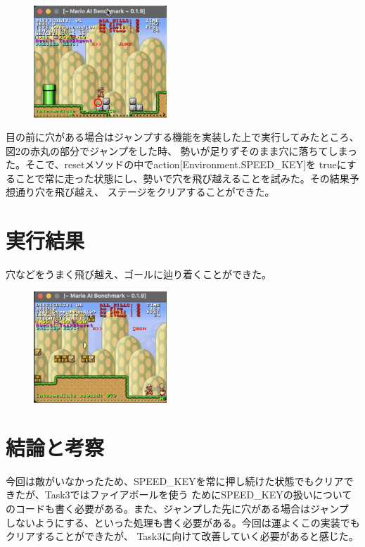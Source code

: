\documentclass[a4paper,11pt]{jsarticle}
\begin{document}
\begin{figure}
  \begin{center}
    \includegraphics*[width=50mm]{images/report2/walking-jump.png}
    \caption[図2]{}
  \end{center}
\end{figure}

目の前に穴がある場合はジャンプする機能を実装した上で実行してみたところ、図2の赤丸の部分でジャンプをした時、
勢いが足りずそのまま穴に落ちてしまった。そこで、resetメソッドの中でaction[Environment.SPEED\_KEY]を
trueにすることで常に走った状態にし、勢いで穴を飛び越えることを試みた。その結果予想通り穴を飛び越え、
ステージをクリアすることができた。

\section*{実行結果}
穴などをうまく飛び越え、ゴールに辿り着くことができた。

\begin{figure}
  \begin{center}
    \includegraphics*[width=50mm]{images/report2/reaching-goal.png}
  \end{center}
\end{figure}

\section*{結論と考察}
今回は敵がいなかったため、SPEED\_KEYを常に押し続けた状態でもクリアできたが、Task3ではファイアボールを使う
ためにSPEED\_KEYの扱いについてのコードも書く必要がある。また、ジャンプした先に穴がある場合はジャンプ
しないようにする、といった処理も書く必要がある。今回は運よくこの実装でもクリアすることができたが、
Task3に向けて改善していく必要があると感じた。

\printbibliography[title=参考文献]
\end{document}
